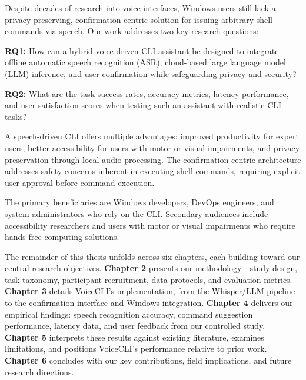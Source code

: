 \documentclass[a4paper,12pt]{article}
\begin{document}
Despite decades of research into voice interfaces, Windows users still lack a privacy-preserving, confirmation-centric solution for issuing arbitrary shell commands via speech. Our work addresses two key research questions:
\begin{description}
    \item\textbf{RQ1:} How can a hybrid voice-driven CLI assistant be designed to integrate offline automatic speech recognition (ASR), cloud-based large language model (LLM) inference, and user confirmation while safeguarding privacy and security?

    \item\textbf{RQ2:} What are the task success rates, accuracy metrics, latency performance, and user satisfaction scores when testing such an assistant with realistic CLI tasks?
\end{description}
A speech-driven CLI offers multiple advantages: improved productivity for expert users, better accessibility for users with motor or visual impairments, and privacy preservation through local audio processing. The confirmation-centric architecture addresses safety concerns inherent in executing shell commands, requiring explicit user approval before command execution.


 



The primary beneficiaries are Windows developers, DevOps engineers, and system administrators who rely on the CLI. Secondary audiences include accessibility researchers and users with motor or visual impairments who require hands-free computing solutions.

The remainder of this thesis unfolds across six chapters, each building toward our central research objectives. \textbf{Chapter 2} presents our methodology—study design, task taxonomy, participant recruitment, data protocols, and evaluation metrics. \textbf{Chapter 3} details VoiceCLI's implementation, from the Whisper/LLM pipeline to the confirmation interface and Windows integration. \textbf{Chapter 4} delivers our empirical findings: speech recognition accuracy, command suggestion performance, latency data, and user feedback from our controlled study. \textbf{Chapter 5} interprets these results against existing literature, examines limitations, and positions VoiceCLI's performance relative to prior work. \textbf{Chapter 6} concludes with our key contributions, field implications, and future research directions.

\newpage
\end{document}
